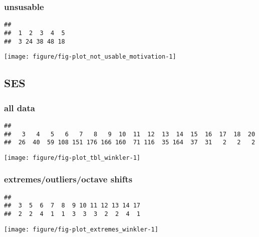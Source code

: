 \documentclass[a4]{article}\usepackage[]{graphicx}\usepackage[]{color}
\makeatletter
\def\maxwidth{ %
  \ifdim\Gin@nat@width>\linewidth
    \linewidth
  \else
    \Gin@nat@width
  \fi
}
\newenvironment{kframe}{%
 \def\at@end@of@kframe{}%
 \ifinner\ifhmode%
  \def\at@end@of@kframe{\end{minipage}}%
  \begin{minipage}{\columnwidth}%
 \fi\fi%
 \def\FrameCommand##1{\hskip\@totalleftmargin \hskip-\fboxsep
 \colorbox{shadecolor}{##1}\hskip-\fboxsep
     \hskip-\linewidth \hskip-\@totalleftmargin \hskip\columnwidth}%
 \MakeFramed {\advance\hsize-\width
   \@totalleftmargin\z@ \linewidth\hsize
   \@setminipage}}%
 {\par\unskip\endMakeFramed%
 \at@end@of@kframe}
\newenvironment{knitrout}{}{} %
\makeatother
\begin{document}
\subsubsection{unsusable}
\begin{knitrout}
\color{fgcolor}\begin{kframe}
\begin{verbatim}
## 
##  1  2  3  4  5 
##  3 24 38 48 18
\end{verbatim}
\end{kframe}
\end{knitrout}
\begin{knitrout}
\color{fgcolor}
\texttt{[image: figure/fig-plot\_not\_usable\_motivation-1]} 

\end{knitrout}
\clearpage
\subsection{SES}
\subsubsection{all data}
\begin{knitrout}
\color{fgcolor}\begin{kframe}
\begin{verbatim}
## 
##   3   4   5   6   7   8   9  10  11  12  13  14  15  16  17  18  20 
##  26  40  59 108 151 176 166 160  71 116  35 164  37  31   2   2   2
\end{verbatim}
\end{kframe}
\end{knitrout}
\begin{knitrout}
\color{fgcolor}
\texttt{[image: figure/fig-plot\_tbl\_winkler-1]} 

\end{knitrout}
\clearpage
\subsubsection{extremes/outliers/octave shifts}
\begin{knitrout}
\color{fgcolor}\begin{kframe}
\begin{verbatim}
## 
##  3  5  6  7  8  9 10 11 12 13 14 17 
##  2  2  4  1  1  3  3  3  2  2  4  1
\end{verbatim}
\end{kframe}
\end{knitrout}
\begin{knitrout}
\color{fgcolor}
\texttt{[image: figure/fig-plot\_extremes\_winkler-1]} 

\end{knitrout}
\clearpage
\end{document}
